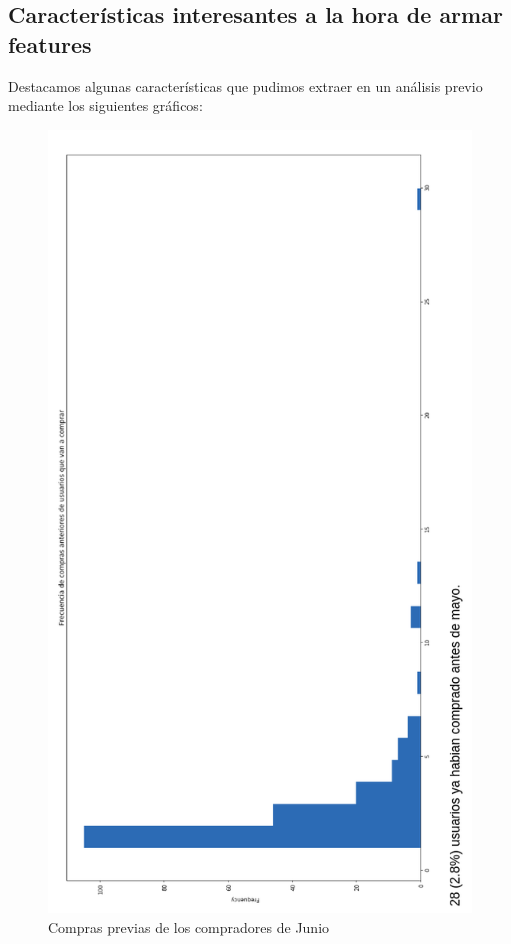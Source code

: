 \documentclass[a4paper ,12pt]{article}
\begin{document}
\newpage
\subsection{Características interesantes a la hora de armar features}

Destacamos algunas características que pudimos extraer en un análisis previo mediante los siguientes gráficos:

\newpage

\begin{figure}[H]
\centering
\includegraphics[width=\linewidth ,  height=0.95\textheight ]{compras_prev_a_compras}
\caption{Compras previas de los compradores de Junio}
\label{fig:compras_prev_a_compras}
\end{figure}
\end{document}
